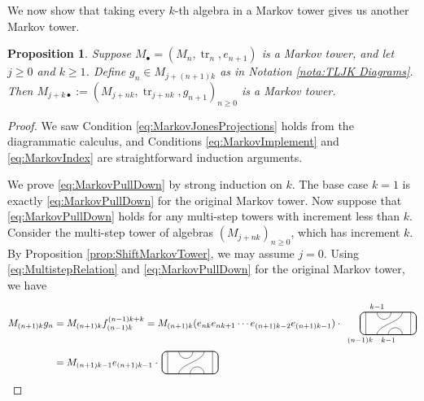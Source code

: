 \documentclass[11pt]{article}
\theoremstyle{plain}
\newtheorem{prop}[thm]{Proposition}
\theoremstyle{definition}
\DeclareMathOperator{\tr}{tr}
\begin{document}
We now show that taking every $k$-th algebra in a Markov tower gives us another Markov tower.

\begin{prop}
\label{prop:MultistepJonesProjections}
Suppose $M_\bullet=(M_n, \tr_n, e_{n+1})$ is a Markov tower, and let $j\geq 0$ and $k\geq 1$.
Define $g_n \in M_{j+(n+1)k}$ as in Notation \ref{nota:TLJK Diagrams}.
Then $M_{j+k\bullet}:=(M_{j+nk}, \tr_{j+nk}, g_{n+1})_{n\geq 0}$ is a Markov tower.
\end{prop}
\begin{proof}
We saw Condition \ref{eq:MarkovJonesProjections} holds from the diagrammatic calculus, and Conditions \ref{eq:MarkovImplement} and \ref{eq:MarkovIndex} are straightforward induction arguments.

We prove \ref{eq:MarkovPullDown} by strong induction on $k$.
The base case $k=1$ is exactly \ref{eq:MarkovPullDown} for the original Markov tower.
Now suppose that \ref{eq:MarkovPullDown} holds for any multi-step towers with increment less than $k$.
Consider the multi-step tower of algebras $(M_{j+nk})_{n\geq 0}$, which has increment $k$.
By Proposition \ref{prop:ShiftMarkovTower}, we may assume $j=0$.
Using \eqref{eq:MultistepRelation} and \ref{eq:MarkovPullDown} for the original Markov tower, we have 
\begin{align*}
M_{(n+1)k} g_n 
&= 
M_{(n+1)k} f^{(n-1)k+k}_{(n-1)k} 
= 
M_{(n+1)k}
(e_{nk}e_{nk+1}\cdots e_{(n+1)k-2}e_{(n+1)k-1})
\cdot\,
\begin{tikzpicture}[baseline = .3cm]
 \draw[thick, rounded corners = 5pt] (0,0) rectangle (2,.8);
 \draw (.2,0) -- (.2,.8);
 \draw (1.8,0) -- (1.8,.8);
 \draw (.6,.8) arc (-180:0:.25cm);
 \draw (.6,0)  .. controls ++(90:.35cm) and ++(270:.35cm) .. (1.5,.8);
 \draw (1,0) arc (180:0:.25cm);
 \node at (.6,1) {\scriptsize{$k{-}1$}};
 \node at (1,-.2) {\scriptsize{$k{-}1$}};
 \node at (0,-.2) {\scriptsize{$(n{-}1)k$}};
\end{tikzpicture}
\\&=
M_{(n+1)k-1} 
e_{(n+1)k-1}
\cdot \,
\begin{tikzpicture}[baseline = .3cm]
 \draw[thick, rounded corners = 5pt] (0,0) rectangle (2,.8);
 \draw (.2,0) -- (.2,.8);
 \draw (1.8,0) -- (1.8,.8);
 \draw (.6,.8) arc (-180:0:.25cm);
 \draw (.6,0)  .. controls ++(90:.35cm) and ++(270:.35cm) .. (1.5,.8);
 \draw (1,0) arc (180:0:.25cm);

\end{tikzpicture}
\end{align*}
\end{proof}
\end{document}
